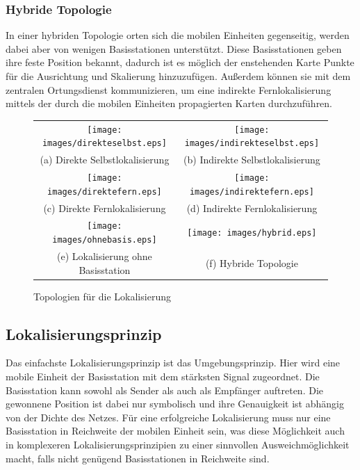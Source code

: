\subsubsection{Hybride Topologie}
In einer hybriden Topologie orten sich die mobilen Einheiten gegenseitig, werden dabei aber von wenigen Basisstationen unterstützt.
Diese Basisstationen geben ihre feste Position bekannt, dadurch ist es möglich der enstehenden Karte Punkte für die Ausrichtung und Skalierung hinzuzufügen.
Außerdem können sie mit dem zentralen Ortungsdienst kommunizieren, um eine indirekte Fernlokalisierung mittels der durch die mobilen Einheiten propagierten Karten durchzuführen.

\begin{figure}[h!]
	\centering

	\begin{tabular}{cc}
		\texttt{[image: images/direkteselbst.eps]} & \texttt{[image: images/indirekteselbst.eps]} \\
		(a) Direkte Selbstlokalisierung & (b) Indirekte Selbstlokalisierung \\
		\texttt{[image: images/direktefern.eps]} & \texttt{[image: images/indirektefern.eps]} \\
		(c) Direkte Fernlokalisierung & (d) Indirekte Fernlokalisierung \\
		\texttt{[image: images/ohnebasis.eps]} & \texttt{[image: images/hybrid.eps]} \\
		(e) Lokalisierung ohne Basisstation & (f) Hybride Topologie \\
	\end{tabular}
	\caption{Topologien für die Lokalisierung}
	\label{fig:topo}
\end{figure}

\subsection{Lokalisierungsprinzip}
Das einfachste Lokalisierungsprinzip ist das Umgebungsprinzip. 
Hier wird eine mobile Einheit der Basisstation mit dem stärksten Signal zugeordnet. 
Die Basisstation kann sowohl als Sender als auch als Empfänger auftreten. 
Die gewonnene Position ist dabei nur symbolisch und ihre Genauigkeit ist abhängig von der Dichte des Netzes. 
Für eine erfolgreiche Lokalisierung muss nur eine Basisstation in Reichweite der mobilen Einheit sein, was diese Möglichkeit auch in komplexeren Lokalisierungsprinzipien zu einer sinnvollen Ausweichmöglichkeit macht, falls nicht genügend Basisstationen in Reichweite sind. 

